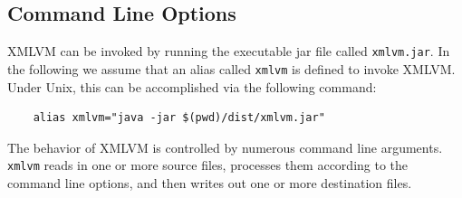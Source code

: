 \documentclass[11pt]{book}
\newcommand{\xmlvm}{\texttt{xmlvm} }
\begin{document}
\subsection{Command Line Options}
\label{SEC_COMMAND_LINE_OPTIONS}

XMLVM can be invoked by running the executable jar file called
\texttt{xmlvm.jar}. In the following we assume that an alias called
\xmlvm is defined to invoke XMLVM. Under Unix, this can be
accomplished via the following command:

\begin{verbatim}
    alias xmlvm="java -jar $(pwd)/dist/xmlvm.jar"
\end{verbatim}

The behavior of XMLVM is controlled by numerous command line
arguments. \xmlvm reads in one or more source files, processes them
according to the command line options, and then writes out one or more
destination files.
\end{document}
